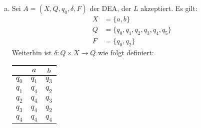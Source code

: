 \begin{enumerate}[1.]
\begin{enumerate}[(a)]
      \item Sei $A = (X, Q, q_0, \delta, F)$ der DEA, der $L$ akzeptiert. Es gilt:
        \begin{align*}
          X & = \{a, b\}\\
          Q & = \{q_0, q_1, q_2, q_3, q_4, q_5\}\\
          F & = \{q_0, q_2\}
        \end{align*}
        Weiterhin ist $\delta: Q \times X \rightarrow Q$ wie folgt definiert:
        \begin{center}
          \begin{tabular}{lcc}
            \toprule
                  & $a$ & $b$\\
            \midrule
            $q_0$ & $q_1$ & $q_3$\\
            $q_1$ & $q_4$ & $q_2$\\
            $q_2$ & $q_4$ & $q_3$\\
            $q_3$ & $q_4$ & $q_2$\\
            $q_4$ & $q_4$ & $q_4$\\
            \bottomrule
          \end{tabular}
        \end{center}
  \end{enumerate}
\end{enumerate}
